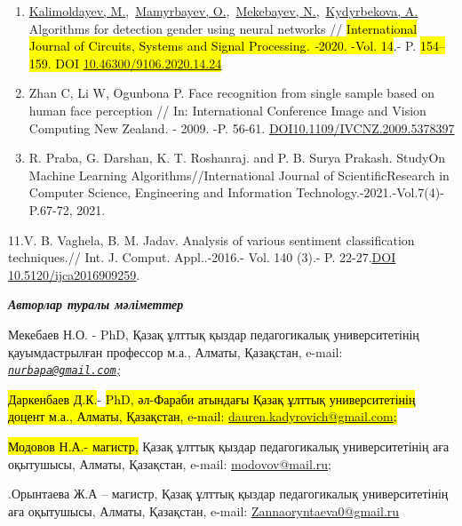 \documentclass[
]{article}
\begin{document}
\begin{enumerate}
\item
  \href{https://www.scopus.com/authid/detail.uri?authorId=56153126500}{Kalimoldayev,
  M.},~\href{https://www.scopus.com/authid/detail.uri?authorId=55967630400}{Mamyrbayev,
  O.},~\href{https://www.scopus.com/authid/detail.uri?authorId=57202316868}{Mekebayev,
  N.},~\href{https://www.scopus.com/authid/detail.uri?authorId=57208346238}{Kydyrbekova,
  A.} Algorithms for detection gender using neural networks //
  \hl{International Journal of Circuits, Systems and Signal
  Processing\emph{. -}2020. -Vol. 14}.- P. \hl{154--159. DOI
  \href{https://doi.org/10.46300/9106.2020.14.24}{10.46300/9106.2020.14.24}}
\item
  Zhan C, Li W, Ogunbona P. Face recognition from single sample based on
  human face perception // In: International Conference Image and Vision
  Computing New Zealand. - 2009. -P. 56-61.
  \href{https://doi.org/10.1109/IVCNZ.2009.5378397}{DOI10.1109/IVCNZ.2009.5378397}
\item
  R. Praba, G. Darshan, K. T. Roshanraj. and P. B. Surya Prakash.
  StudyOn Machine Learning Algorithms//International Journal of
  ScientificResearch in Computer Science, Engineering and Information
  Technology.-2021.-Vol.7(4)- P.67-72, 2021.
\end{enumerate}

11.V. B. Vaghela, B. M. Jadav. Analysis of various sentiment
classification techniques.// Int. J. Comput. Appl..-2016.- Vol. 140
(3).- P. 22-27.\href{https://doi.org/10.5120/ijca2016909259}{\ul{DOI
10.5120/ijca2016909259}}.

\emph{\textbf{Авторлар туралы мәліметтер}}

Мекебаев Н.О. - PhD, Қазақ ұлттық қыздар педагогикалық университетінің
қауымдастрылған профессор м.а., Алматы, Қазақстан, e-mail:
\emph{\ul{\href{mailto:nurbapa@gmail.com}{\nolinkurl{nurbapa@gmail.com}};}}

\hl{Даркенбаев Д.К.}- \hl{PhD, әл-Фараби атындағы Қазақ ұлттық
университетінің доцент м.а., Алматы, Қазақстан, e-mail:
\href{mailto:dauren.kadyrovich@gmail.com}{\ul{dauren.kadyrovich@gmail.com}};}

\hl{Модовов Н.А.- магистр,} Қазақ ұлттық қыздар педагогикалық
университетінің аға оқытушысы, Алматы, Қазақстан, e-mail:
\href{mailto:modovov@mail.ru}{\ul{modovov@mail.ru}};

.Орынтаева Ж.А -- магистр, Қазақ ұлттық қыздар педагогикалық
университетінің аға оқытушысы, Алматы, Қазақстан, e-mail:
\href{mailto:Zannaoryntaeva0@gmail.ru}{\ul{Zannaoryntaeva0@gmail.ru}}
\end{document}
